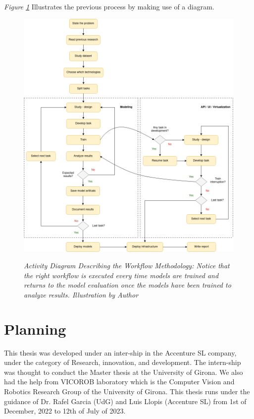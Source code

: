 \textit{Figure \ref{fig:flux_development}} Illustrates the previous process by making use of a diagram. 

\newpage


\begin{figure}[H]
\centering
\includegraphics[width=\textwidth]{imatges/planing_and_methodology/EmplyedMethodology.png}
\caption[Activity Diagram Describing the Methodology.]{\textit{Activity Diagram Describing the Workflow Methodology: Notice that the right workflow is executed every time models are trained and returns to the model evaluation once the models have been trained to analyze results. Illustration by Author}}
{\label{fig:flux_development}}
\end{figure}


\newpage


\section{Planning}

This thesis was developed under an inter-ship in the Accenture SL company, under the category of Research, innovation, and development. The intern-ship was thought to conduct the Master thesis at the University of Girona. We also had the help from VICOROB laboratory which is the Computer Vision and Robotics Research Group of the University of Girona. This thesis runs under the guidance of Dr. Rafel Garcia (UdG) and Luis Llopis (Accenture SL) from 1st of December, 2022 to 12th of July of 2023. \\

